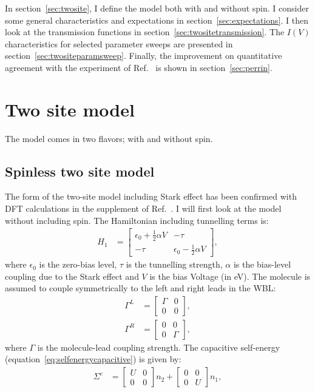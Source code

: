 In section~\ref{sec:twosite}, I define the model both with and without spin. I consider some general characteristics and expectations in section~\ref{sec:expectations}. I then look at the transmission functions in section~\ref{sec:twositetransmission}. The $I(V)$ characteristics for selected parameter sweeps are presented in section~\ref{sec:twositeparamsweep}. Finally, the improvement on quantitative agreement with the experiment of Ref.~\cite{perrinnano} is shown in section~\ref{sec:perrin}.


\section{Two site model} 
The model comes in two flavors; with and without spin. 
\label{sec:twosite}
\subsection{Spinless two site model}
The form of the two-site model including Stark effect has been confirmed with DFT calculations in the supplement of Ref.~\cite{perrinnano}. I  will first look at the model without including spin. The Hamiltonian including tunnelling terms is:
\begin{align}
H_1 &= \begin{bmatrix} \epsilon_0 + \frac{1}{2} \alpha V & -\tau \\
-\tau & \epsilon_0 - \frac{1}{2} \alpha V\end{bmatrix},
\label{eq:spinlesshamiltonian}
\end{align}
where $\epsilon_0$ is the zero-bias level, $\tau$ is the tunnelling strength, $\alpha$ is the bias-level coupling due to the Stark effect and $V$ is the bias Voltage (in eV). The molecule is assumed to couple symmetrically to the left and right leads in the WBL:
\begin{align*}
\Gamma^L &= \begin{bmatrix} \Gamma & 0 \\ 0 & 0 \end{bmatrix},\\ \Gamma^R &= \begin{bmatrix} 0 & 0 \\ 0 & \Gamma \end{bmatrix},
\end{align*}
where $\Gamma$ is the molecule-lead coupling strength. The capacitive self-energy (equation~\ref{eq:selfenergycapacitive}) is given by:
\begin{align*}
\Sigma^c &= \begin{bmatrix} U & 0 \\ 0 & 0 \end{bmatrix} n_2 + \begin{bmatrix} 0 & 0 \\ 0 & U \end{bmatrix} n_1,
\end{align*}
